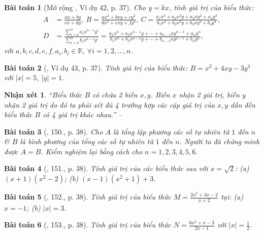 \documentclass{article}
\newtheorem{baitoan}{Bài toán}
\newtheorem{nhanxet}{Nhận xét}
\begin{document}
\begin{baitoan}[Mở rộng \cite{Tuyen_Toan_7}, Ví dụ 42, p. 37]
	\label{mo rong Tuyen_Toan_7 vi du 42}
	Cho $y = kx$, tính giá trị của biểu thức:
	\begin{align*}
		A &= \frac{ax + by}{cx + dy},\ B = \frac{ax^2 + bxy + cy^2}{dx^2 + exy + fy^2},\ C = \frac{a_1x^3 + a_2x^2y + a_3xy^2 + a_4y^3}{b_1x^3 + b_2x^2y + b_3xy^2 + b_4y^3},\\
		D &= \frac{\sum_{i=0}^n a_ix^{n-i}y^i}{\sum_{i=0}^n b_ix^{n-i}y^i} = \frac{a_1x^n + a_2x^{n-1}y + \cdots + a_{n-1}xy^{n-1} + a_ny^n}{b_1x^n + b_2x^{n-1}y + \cdots + b_{n-1}xy^{n-1} + b_ny^n},
	\end{align*}
	với $a,b,c,d,e,f,a_i,b_i\in\mathbb{R}$, $\forall i = 1,2,\ldots,n$.
\end{baitoan}

\begin{baitoan}[\cite{Tuyen_Toan_7}, Ví dụ 43, p. 37]
	Tính giá trị của biểu thức: $B = x^2 + 4xy - 3y^3$ với $|x| = 5$, $|y| = 1$.
\end{baitoan}

\begin{nhanxet}
	``Biểu thức $B$ có chứa 2 biến $x,y$. Biến $x$ nhận 2 giá trị, biến $y$ nhận 2 giá trị do đó ta phải xét đủ 4 trường hợp các cặp giá trị của $x,y$ dẫn đến biểu thức $B$ có 4 giá trị khác nhau.'' -- \cite[p. 38]{Tuyen_Toan_7}
\end{nhanxet}

\begin{baitoan}[\cite{Tuyen_Toan_7}, 150., p. 38]
	Cho $A$ là tổng lập phương các số tự nhiên từ $1$ đến $n$ \& $B$ là bình phương của tổng các số tự nhiên từ $1$ đến $n$. Người ta đã chứng minh được $A = B$. Kiểm nghiệm lại bằng cách cho $n = 1,2,3,4,5,6$.
\end{baitoan}

\begin{baitoan}[\cite{Tuyen_Toan_7}, 151., p. 38]
	Tính giá trị của các biểu thức sau với $x = \sqrt{2}$: (a) $(x + 1)(x^2 - 2)$; (b) $(x - 1)(x^2 + 1) + 3$.
\end{baitoan}

\begin{baitoan}[\cite{Tuyen_Toan_7}, 152., p. 38]
	Tính giá trị của biểu thức $M = \frac{2x^2 + 3x - 2}{x + 2}$ tại: (a) $x = -1$; (b) $|x| = 3$.
\end{baitoan}

\begin{baitoan}[\cite{Tuyen_Toan_7}, 153., p. 38]
	Tính giá trị của biểu thức $N = \frac{6x^2 + x - 3}{2x - 1}$ với $|x| = \frac{1}{2}$.
\end{baitoan}
\end{document}

